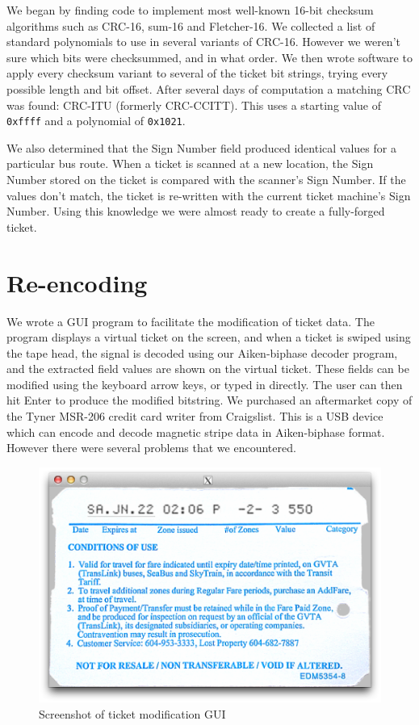 \documentclass[fontsize=12pt]{scrartcl}
\begin{document}
We began by finding code to implement most well-known 16-bit checksum algorithms such as CRC-16, sum-16 and Fletcher-16. We collected a list of standard polynomials to use in several variants of CRC-16. However we weren't sure which bits were checksummed, and in what order. We then wrote software to apply every checksum variant to several of the ticket bit strings, trying every possible length and bit offset. After several days of computation a matching CRC was found: CRC-ITU (formerly CRC-CCITT). This uses a starting value of \texttt{0xffff} and a polynomial of \texttt{0x1021}.

We also determined that the Sign Number field produced identical values for a particular bus route. When a ticket is scanned at a new location, the Sign Number stored on the ticket is compared with the scanner's Sign Number. If the values don't match, the ticket is re-written with the current ticket machine's Sign Number. Using this knowledge we were almost ready to create a fully-forged ticket.

\section{Re-encoding}
We wrote a GUI program to facilitate the modification of ticket data. The program displays a virtual ticket on the screen, and when a ticket is swiped using the tape head, the signal is decoded using our Aiken-biphase decoder program, and the extracted field values are shown on the virtual ticket. These fields can be modified using the keyboard arrow keys, or typed in directly. The user can then hit Enter to produce the modified bitstring. We purchased an aftermarket copy of the Tyner MSR-206 credit card writer from Craigslist. This is a USB device which can encode and decode magnetic stripe data in Aiken-biphase format. However there were several problems that we encountered.



\begin{figure}[ht!]
\centering
\includegraphics[width=130mm]{ss.png}
\caption{Screenshot of ticket modification GUI}
\end{figure}
\end{document}
